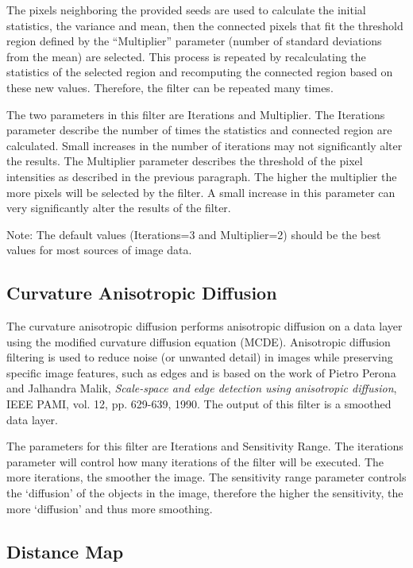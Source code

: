 \documentclass[fleqn,11pt,openany]{book}
\begin{document}
The pixels neighboring the provided seeds are used to calculate the initial statistics, the variance and mean, then the connected pixels that fit the threshold region defined by the ``Multiplier'' parameter (number of standard deviations from the mean) are selected.  This process is repeated by recalculating the statistics of the selected region and recomputing the connected region based on these new values.  Therefore, the filter can be repeated many times.  

The two parameters in this filter are Iterations and Multiplier.  The Iterations parameter describe the number of times the statistics and connected region are calculated.  Small increases in the number of iterations may not significantly alter the results.  The Multiplier parameter describes the threshold of the pixel intensities as described in the previous paragraph.  The higher the multiplier the more pixels will be selected by the filter.  A small increase in this parameter can very significantly alter the results of the filter.  

Note:  The default values (Iterations=3 and Multiplier=2) should be the best values for most sources of image data.  

\subsection{Curvature Anisotropic Diffusion}

The curvature anisotropic diffusion performs anisotropic diffusion on a data layer using the modified curvature diffusion equation (MCDE).  Anisotropic diffusion filtering is used to reduce noise (or unwanted detail) in images while preserving specific image features, such as edges and is based on the work of Pietro Perona and Jalhandra Malik, \emph{Scale-space and edge detection using anisotropic diffusion}, IEEE PAMI, vol. 12, pp. 629-639, 1990.  The output of this filter is a smoothed data layer.

The parameters for this filter are Iterations and Sensitivity Range.  The iterations parameter will control how many iterations of the filter will be executed.  The more iterations, the smoother the image.  The sensitivity range parameter controls the `diffusion' of the objects in the image, therefore the higher the sensitivity, the more `diffusion' and thus more smoothing.  

\subsection{Distance Map}
\end{document}
